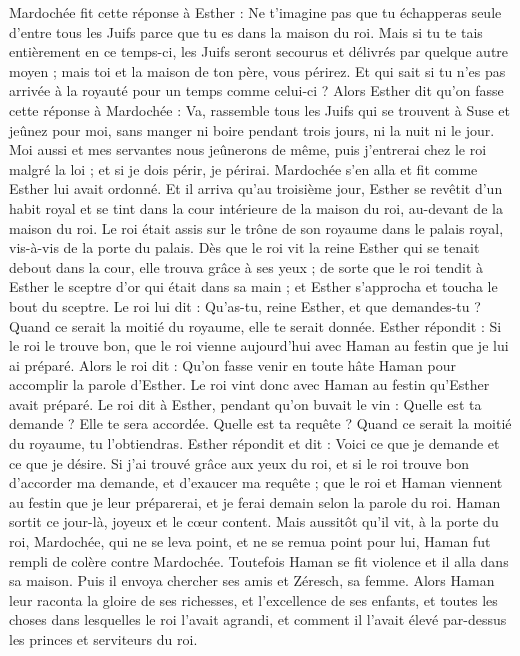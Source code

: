 \begin{multicols}{2}
Mardochée fit cette réponse à Esther : Ne t'imagine pas que tu échapperas seule d'entre tous les Juifs parce que tu es dans la maison du roi.
Mais si tu te tais entièrement en ce temps-ci, les Juifs seront secourus et délivrés par quelque autre moyen ; mais toi et la maison de ton père, vous périrez. Et qui sait si tu n'es pas arrivée à la royauté pour un temps comme celui-ci ?
Alors Esther dit qu'on fasse cette réponse à Mardochée :
Va, rassemble tous les Juifs qui se trouvent à Suse et jeûnez pour moi, sans manger ni boire pendant trois jours, ni la nuit ni le jour. Moi aussi et mes servantes nous jeûnerons de même, puis j'entrerai chez le roi malgré la loi ; et si je dois périr, je périrai.
Mardochée s'en alla et fit comme Esther lui avait ordonné.
\VerseOne{}Et il arriva qu'au troisième jour, Esther se revêtit d'un habit royal et se tint dans la cour intérieure de la maison du roi, au-devant de la maison du roi. Le roi était assis sur le trône de son royaume dans le palais royal, vis-à-vis de la porte du palais.
Dès que le roi vit la reine Esther qui se tenait debout dans la cour, elle trouva grâce à ses yeux ; de sorte que le roi tendit à Esther le sceptre d'or qui était dans sa main ; et Esther s'approcha et toucha le bout du sceptre.
Le roi lui dit : Qu'as-tu, reine Esther, et que demandes-tu ? Quand ce serait la moitié du royaume, elle te serait donnée.
Esther répondit : Si le roi le trouve bon, que le roi vienne aujourd'hui avec Haman au festin que je lui ai préparé.
Alors le roi dit : Qu'on fasse venir en toute hâte Haman pour accomplir la parole d'Esther. Le roi vint donc avec Haman au festin qu'Esther avait préparé.
Le roi dit à Esther, pendant qu'on buvait le vin : Quelle est ta demande ? Elle te sera accordée. Quelle est ta requête ? Quand ce serait la moitié du royaume, tu l'obtiendras.
Esther répondit et dit : Voici ce que je demande et ce que je désire.
Si j'ai trouvé grâce aux yeux du roi, et si le roi trouve bon d'accorder ma demande, et d'exaucer ma requête ; que le roi et Haman viennent au festin que je leur préparerai, et je ferai demain selon la parole du roi.
Haman sortit ce jour-là, joyeux et le cœur content. Mais aussitôt qu'il vit, à la porte du roi, Mardochée, qui ne se leva point, et ne se remua point pour lui, Haman fut rempli de colère contre Mardochée.
Toutefois Haman se fit violence et il alla dans sa maison. Puis il envoya chercher ses amis et Zéresch, sa femme.
Alors Haman leur raconta la gloire de ses richesses, et l'excellence de ses enfants, et toutes les choses dans lesquelles le roi l'avait agrandi, et comment il l'avait élevé par-dessus les princes et serviteurs du roi.

\end{multicols}
